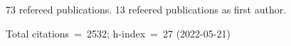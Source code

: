 73 refereed publications. 13 refeered publications as first author.

Total citations~=~2532; h-index~=~27 (2022-05-21)